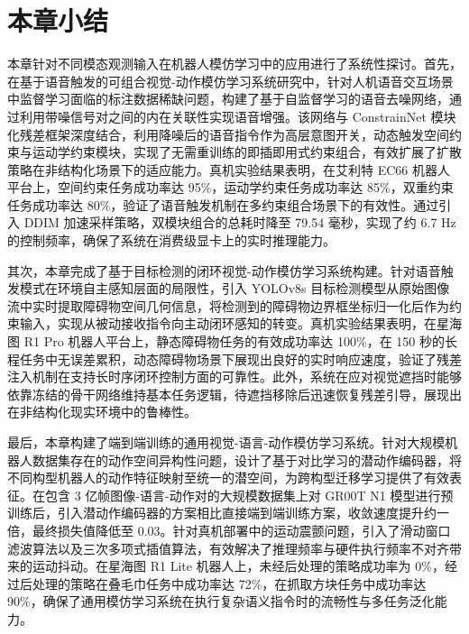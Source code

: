 \section{本章小结}

本章针对不同模态观测输入在机器人模仿学习中的应用进行了系统性探讨。首先，在基于语音触发的可组合视觉-动作模仿学习系统研究中，针对人机语音交互场景中监督学习面临的标注数据稀缺问题，构建了基于自监督学习的语音去噪网络，通过利用带噪信号对之间的内在关联性实现语音增强。该网络与 ConstrainNet 模块化残差框架深度结合，利用降噪后的语音指令作为高层意图开关，动态触发空间约束与运动学约束模块，实现了无需重训练的即插即用式约束组合，有效扩展了扩散策略在非结构化场景下的适应能力。真机实验结果表明，在艾利特 EC66 机器人平台上，空间约束任务成功率达 95\%，运动学约束任务成功率达 85\%，双重约束任务成功率达 80\%，验证了语音触发机制在多约束组合场景下的有效性。通过引入 DDIM 加速采样策略，双模块组合的总耗时降至 79.54 毫秒，实现了约 6.7 Hz 的控制频率，确保了系统在消费级显卡上的实时推理能力。

其次，本章完成了基于目标检测的闭环视觉-动作模仿学习系统构建。针对语音触发模式在环境自主感知层面的局限性，引入 YOLOv8s 目标检测模型从原始图像流中实时提取障碍物空间几何信息，将检测到的障碍物边界框坐标归一化后作为约束输入，实现从被动接收指令向主动闭环感知的转变。真机实验结果表明，在星海图 R1 Pro 机器人平台上，静态障碍物任务的有效成功率达 100\%，在 150 秒的长程任务中无误差累积，动态障碍物场景下展现出良好的实时响应速度，验证了残差注入机制在支持长时序闭环控制方面的可靠性。此外，系统在应对视觉遮挡时能够依靠冻结的骨干网络维持基本任务逻辑，待遮挡移除后迅速恢复残差引导，展现出在非结构化现实环境中的鲁棒性。

最后，本章构建了端到端训练的通用视觉-语言-动作模仿学习系统。针对大规模机器人数据集存在的动作空间异构性问题，设计了基于对比学习的潜动作编码器，将不同构型机器人的动作特征映射至统一的潜空间，为跨构型迁移学习提供了有效表征。在包含 3 亿帧图像-语言-动作对的大规模数据集上对 GR00T N1 模型进行预训练后，引入潜动作编码器的方案相比直接端到端训练方案，收敛速度提升约一倍，最终损失值降低至 0.03。针对真机部署中的运动震颤问题，引入了滑动窗口滤波算法以及三次多项式插值算法，有效解决了推理频率与硬件执行频率不对齐带来的运动抖动。在星海图 R1 Lite 机器人上，未经后处理的策略成功率为 0\%，经过后处理的策略在叠毛巾任务中成功率达 72\%，在抓取方块任务中成功率达 90\%，确保了通用模仿学习系统在执行复杂语义指令时的流畅性与多任务泛化能力。
